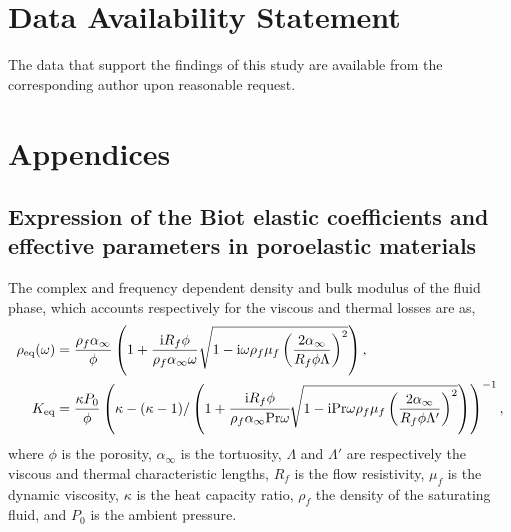 \section*{Data Availability Statement}
The data that support the findings of this study are available from the corresponding author upon reasonable request. 

\section{Appendices}
\renewcommand{\thesubsection}{\thesection.\Alph{subsection}}
\subsection{Expression of the Biot elastic coefficients and effective parameters in poroelastic materials} \label{app:coefs}

The complex and frequency dependent density and bulk modulus of the fluid phase, which
accounts respectively for the viscous and thermal losses are \cite{johnson1987,champoux1991} as,
\begin{equation}
\begin{aligned}
 \rho_{\text{eq}}(\omega) &= \frac{\rho_{f} \alpha_{\infty}}{\phi}\left(1+\frac{\textrm{i}R_f \phi}{\rho_f \alpha_\infty\omega} \sqrt{1- \mathrm i  \omega  \rho_{f} \mu_f \left(\frac{ 2\alpha_{\infty}}{R_f \phi \Lambda}\right)^2 }\right),\\
K_{\text{eq}} &=\frac{\kappa P_{0}}{\phi}\left(\kappa-(\kappa-1)/\left(1+ \cfrac{\mathrm{i}R_f \phi}{\rho_f \alpha_\infty\text{Pr} \omega} \sqrt{1- \mathrm i\text{Pr} \omega \rho_{f} \mu_f\left( \frac{ 2\alpha_{\infty}}{R_f \phi \Lambda^{\prime}}\right)^2 }\right)\right)^{-1}, 
\end{aligned}
\end{equation}
where $\phi$ is the porosity, $\alpha_{\infty}$ is the tortuosity, $\Lambda$ and $\Lambda'$ are respectively the viscous and thermal characteristic lengths, $R_f$ is the flow resistivity, $\mu_f$ is the dynamic viscosity, $\kappa$ is the heat capacity ratio, $\rho_f$ the density of the saturating fluid, and $P_0$ is the ambient pressure.


